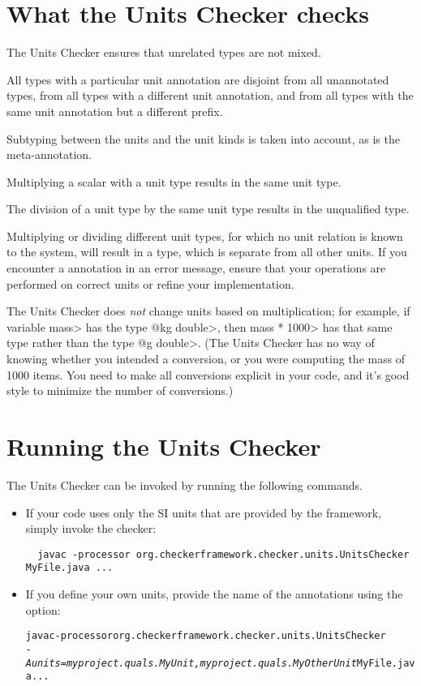 \section{What the Units Checker checks\label{units-checks}}

The Units Checker ensures that unrelated types are not mixed. 

All types with a particular unit annotation are
disjoint from all unannotated types, from all types with a different unit
annotation, and from all types with the same unit annotation but a
different prefix.

Subtyping between the units and the unit kinds is taken into account,
as is the  meta-annotation.

Multiplying a scalar with a unit type results in the same unit type.

The division of a unit type by the same unit type
results in the unqualified type.

Multiplying or dividing different unit types, for which no unit
relation is known to the system, will result in a 
type, which is separate from all other units.
If you encounter a  annotation in an error message,
ensure that your operations are performed on correct units or refine
your  implementation.

The Units Checker does \emph{not} change units based on multiplication; for
example, if variable \<mass> has the type \<@kg double>, then \<mass *
1000> has that same type rather than the type \<@g double>.  (The Units
Checker has no way of knowing whether you intended a conversion, or you
were computing the mass of 1000 items.  You need to make all conversions
explicit in your code, and it's good style to minimize the number of
conversions.)


\section{Running the Units Checker\label{units-running}}

The Units Checker can be invoked by running the following commands.

\begin{itemize}
\item
If your code uses only the SI units that are provided by the
framework, simply invoke the checker:

\begin{Verbatim}
  javac -processor org.checkerframework.checker.units.UnitsChecker MyFile.java ...
\end{Verbatim}

\item 
If you define your own units, provide the name of the annotations using the
 option:

\begin{alltt}
  javac -processor org.checkerframework.checker.units.UnitsChecker \ttbs
        \textit{-Aunits=myproject.quals.MyUnit,myproject.quals.MyOtherUnit} MyFile.java ...
\end{alltt}
\end{itemize}



